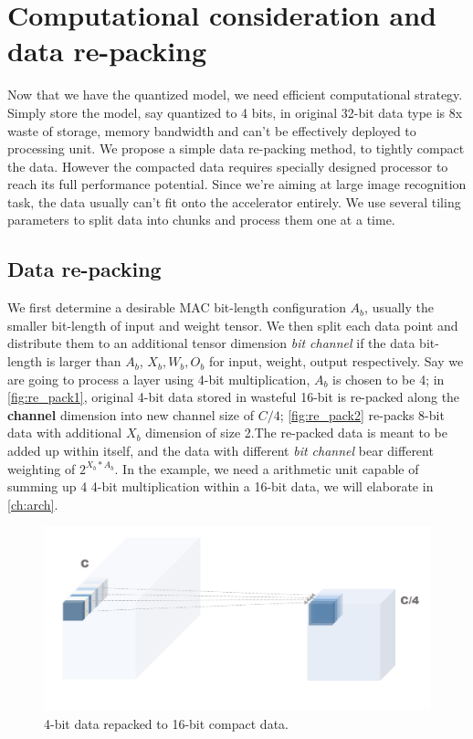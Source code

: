 \section{Computational consideration and data re-packing}
Now that we have the quantized model, we need efficient computational strategy. Simply store the model, say quantized to 4 bits, in original 32-bit data type is 8x waste of storage, memory bandwidth and can't be effectively deployed to processing unit. We propose a simple data re-packing method, to tightly compact the data. However the compacted data requires specially designed processor to reach its full performance potential. Since we're aiming at large image recognition task, the data usually can't fit onto the accelerator entirely. We use several tiling parameters to split data into chunks and process them one at a time.
\subsection{Data re-packing}
We first determine a desirable MAC bit-length configuration \textbf{$A_b$}, usually the smaller bit-length of input and weight tensor. We then split each data point and distribute them to an additional tensor dimension \textit{bit channel} if the data bit-length is larger than \textbf{$A_b$}, \textbf{$X_b,W_b,O_b$} for input, weight, output respectively. Say we are going to process a layer using 4-bit multiplication, \textbf{$A_b$} is chosen to be 4; in \autoref{fig:re_pack1}, original 4-bit data stored in wasteful 16-bit is re-packed along the \textbf{channel} dimension into new channel size of $C/4$; \autoref{fig:re_pack2} re-packs 8-bit data with additional \textbf{$X_b$} dimension of size 2.The re-packed data is meant to be added up within itself, and the data with different \textit{bit channel} bear different weighting of $2^{X_b*A_b}$. In the example, we need a arithmetic unit capable of summing up 4 4-bit multiplication within a 16-bit data, we will elaborate in \autoref{ch:arch}.
\begin{figure}
    \centering
    \includegraphics[width=1\linewidth]{inc/3_low_numeric_convolution_neural_network/figure/re_pack1.png}
    \caption{4-bit data repacked to 16-bit compact data.}
    \label{fig:re_pack1}
\end{figure}
